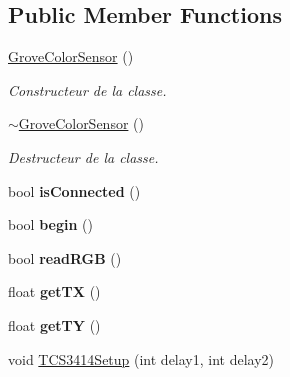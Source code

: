 \subsection*{Public Member Functions}
\begin{DoxyCompactItemize}
\item 
\mbox{\label{classGroveColorSensor_a0a57472cf6ba9df600003bf68f7bd557}} 
\hyperlink{classGroveColorSensor_a0a57472cf6ba9df600003bf68f7bd557}{Grove\+Color\+Sensor} ()
\begin{DoxyCompactList}\small\item\em Constructeur de la classe. \end{DoxyCompactList}\item 
\mbox{\label{classGroveColorSensor_a6c3d8395a8ae1b0bd18e8236cd4a8a31}} 
\hyperlink{classGroveColorSensor_a6c3d8395a8ae1b0bd18e8236cd4a8a31}{$\sim$\+Grove\+Color\+Sensor} ()
\begin{DoxyCompactList}\small\item\em Destructeur de la classe. \end{DoxyCompactList}\item 
\mbox{\label{classGroveColorSensor_aa32408dcce1a55abd72e351faf4d4f26}} 
bool {\bfseries is\+Connected} ()
\item 
\mbox{\label{classGroveColorSensor_aa85f03d535c39540fad1a410ebd8184c}} 
bool {\bfseries begin} ()
\item 
\mbox{\label{classGroveColorSensor_acd8fc1fe584b9aa8e51985ba99ad1836}} 
bool {\bfseries read\+R\+GB} ()
\item 
\mbox{\label{classGroveColorSensor_aa2c72c2e245dc011bc3215aa2bdd84bf}} 
float {\bfseries get\+TX} ()
\item 
\mbox{\label{classGroveColorSensor_ab89e79b04f70f11dea991ca4f9d4de7c}} 
float {\bfseries get\+TY} ()
\item 
\mbox{\label{classGroveColorSensor_a7632f53d6ad2466cf74a39ba08bbd07e}} 
void \hyperlink{classGroveColorSensor_a7632f53d6ad2466cf74a39ba08bbd07e}{T\+C\+S3414\+Setup} (int delay1, int delay2)

\end{DoxyCompactItemize}
